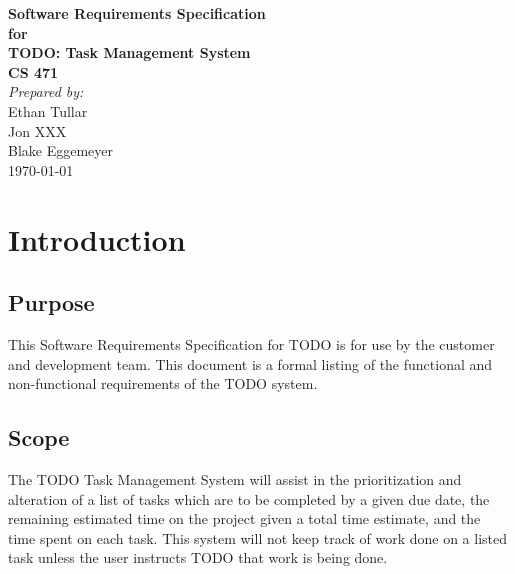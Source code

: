 \documentclass[12pt,a4paper]{article}
\begin{document}
\begin{titlepage}
\begin{flushright} 
{\LARGE \bfseries Software Requirements Specification}\\[1.2cm]
{\large \bfseries for}\\[1.2cm]
{\huge \bfseries TODO: Task Management System}\\[1.2cm]
{\large \bfseries CS 471}\\
\vfill
\emph{Prepared by:} \\
Ethan Tullar\\
Jon XXX\\
Blake Eggemeyer \\ [3cm]
{\large \today}
\end{flushright}
\end{titlepage}
\setcounter{tocdepth}{3}
\tableofcontents
\newpage
\section{Introduction}
\subsection{Purpose}
This Software Requirements Specification for TODO is for use by the customer and development team. This document is a formal listing of the functional and non-functional requirements of the TODO system.
\subsection{Scope}
The TODO Task Management System will assist in the prioritization and alteration of a list of tasks which are to be completed by a given due date, the remaining estimated time on the project given a total time estimate, and the time spent on each task. This system will not keep track of work done on a listed task unless the user instructs TODO that work is being done.
\end{document}
